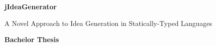 {%


\newcommand{\thesistitle}{jIdeaGenerator}
\newcommand{\thesisauthor}{Happy van Der Promovendum}

\newcommand{\thesisleiter}{Dr.\ Mircea Lungu}
\newcommand{\thesisasst}{}
\newcommand{\thesissubtitle}{A Novel Approach to Idea Generation in Statically-Typed Languages}
\newcommand{\thesisdate}{31. December 9999}


\usepackage[ colorlinks=true, urlcolor=black, linkcolor=black,
			citecolor=black, bookmarksnumbered=true, bookmarks=true,
			plainpages=false,
			pdftitle={\thesistitle}, pdfauthor={\thesisauthor},
			pdfsubject={\thesissubtitle}, pdfpagelabels]{hyperref}

\newcommand{\hrref}[2]{\hyperref}




\begin{titlepage}  
  \begin{center}  
  
  \begin{figure}[t]  
  \vspace*{-2cm}        %
  \vspace{1.2in}     
  \end{figure}

    \thispagestyle{empty}
    
    {\bfseries\Huge \thesistitle \par
    \Large \vspace{0.1in} \thesissubtitle \par}

    \vspace{0.3in} 
    \LARGE{\textbf{Bachelor Thesis} \\}
    \vspace{0.4in}


\end{center}
\end{titlepage}}

